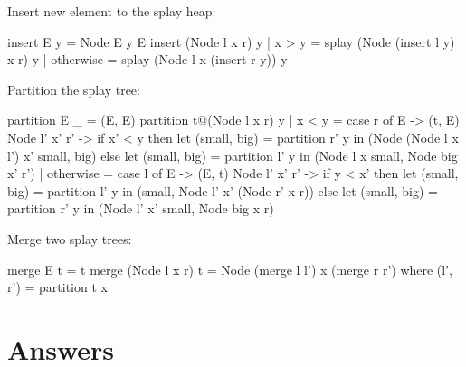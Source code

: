 \documentclass[b5paper]{article}
\begin{document}
Insert new element to the splay heap:

\begin{Haskell}
insert E y = Node E y E
insert (Node l x r) y
    | x > y     = splay (Node (insert l y) x r) y
    | otherwise = splay (Node l x (insert r y)) y
\end{Haskell}

Partition the splay tree:

\begin{Haskell}
partition E _ = (E, E)
partition t@(Node l x r) y
    | x < y =
        case r of
          E -> (t, E)
          Node l' x' r' ->
              if x' < y then
                  let (small, big) = partition r' y in
                  (Node (Node l x l') x' small, big)
              else
                  let (small, big) = partition l' y in
                  (Node l x small, Node big x' r')
    | otherwise =
        case l of
          E -> (E, t)
          Node l' x' r' ->
              if y < x' then
                  let (small, big) = partition l' y in
                  (small, Node l' x' (Node r' x r))
              else
                  let (small, big) = partition r' y in
                  (Node l' x' small, Node big x r)
\end{Haskell}

Merge two splay trees:

\begin{Haskell}
merge E t = t
merge (Node l x r) t = Node (merge l l') x (merge r r')
    where (l', r') = partition t x
\end{Haskell}

\ifx\wholebook\relax \else
\section{Answers}
\shipoutAnswer
\end{document}
